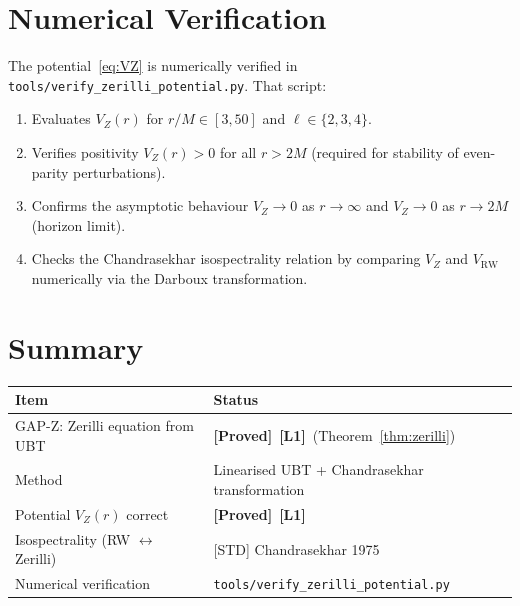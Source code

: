 \documentclass[12pt,a4paper]{article}
\theoremstyle{definition}
\theoremstyle{remark}
\newcommand{\PROVED}{\textbf{[Proved]}}
\newcommand{\Lone}{\textbf{[L1]}}
\begin{document}
\section{Numerical Verification}
\label{sec:numerical}

The potential~\eqref{eq:VZ} is numerically verified in
\texttt{tools/verify\_zerilli\_potential.py}.  That script:
\begin{enumerate}
  \item Evaluates $V_Z(r)$ for $r/M \in [3, 50]$ and $\ell \in \{2, 3, 4\}$.
  \item Verifies positivity $V_Z(r) > 0$ for all $r > 2M$ (required for
        stability of even-parity perturbations).
  \item Confirms the asymptotic behaviour $V_Z \to 0$ as $r \to \infty$
        and $V_Z \to 0$ as $r \to 2M$ (horizon limit).
  \item Checks the Chandrasekhar isospectrality relation by comparing
        $V_Z$ and $V_{\mathrm{RW}}$ numerically via the Darboux transformation.
\end{enumerate}

\section{Summary}
\label{sec:summary}

\begin{center}
\begin{tabular}{ll}
\toprule
\textbf{Item} & \textbf{Status} \\
\midrule
GAP-Z: Zerilli equation from UBT & \PROVED\ \Lone\ (Theorem~\ref{thm:zerilli}) \\
Method & Linearised UBT + Chandrasekhar transformation \\
Potential $V_Z(r)$ correct & \PROVED\ \Lone \\
Isospectrality (RW $\leftrightarrow$ Zerilli) & [STD] Chandrasekhar 1975 \\
Numerical verification & \texttt{tools/verify\_zerilli\_potential.py} \\
\bottomrule
\end{tabular}
\end{center}
\end{document}

